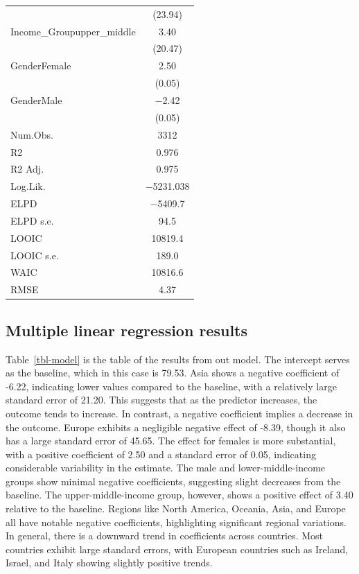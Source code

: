 \documentclass[
  letterpaper,
  DIV=11,
  numbers=noendperiod]{scrartcl}
\begin{document}
\begin{table}
{\begin{tabular}[t]{lc}
 & (\num{23.94})\\
Income\_Groupupper\_middle & \num{3.40}\\
 & (\num{20.47})\\
GenderFemale & \num{2.50}\\
 & \vphantom{1} (\num{0.05})\\
GenderMale & \num{-2.42}\\
 & (\num{0.05})\\
\midrule
Num.Obs. & \num{3312}\\
R2 & \num{0.976}\\
R2 Adj. & \num{0.975}\\
Log.Lik. & \num{-5231.038}\\
ELPD & \num{-5409.7}\\
ELPD s.e. & \num{94.5}\\
LOOIC & \num{10819.4}\\
LOOIC s.e. & \num{189.0}\\
WAIC & \num{10816.6}\\
RMSE & \num{4.37}\\
\bottomrule
\end{tabular}

}

\end{table}%

\subsection{Multiple linear regression
results}\label{multiple-linear-regression-results}

Table~\ref{tbl-model} is the table of the results from out model. The
intercept serves as the baseline, which in this case is 79.53. Asia
shows a negative coefficient of -6.22, indicating lower values compared
to the baseline, with a relatively large standard error of 21.20. This
suggests that as the predictor increases, the outcome tends to increase.
In contrast, a negative coefficient implies a decrease in the outcome.
Europe exhibits a negligible negative effect of -8.39, though it also
has a large standard error of 45.65. The effect for females is more
substantial, with a positive coefficient of 2.50 and a standard error of
0.05, indicating considerable variability in the estimate. The male and
lower-middle-income groups show minimal negative coefficients,
suggesting slight decreases from the baseline. The upper-middle-income
group, however, shows a positive effect of 3.40 relative to the
baseline. Regions like North America, Oceania, Asia, and Europe all have
notable negative coefficients, highlighting significant regional
variations. In general, there is a downward trend in coefficients across
countries. Most countries exhibit large standard errors, with European
countries such as Ireland, Israel, and Italy showing slightly positive
trends.
\end{document}
